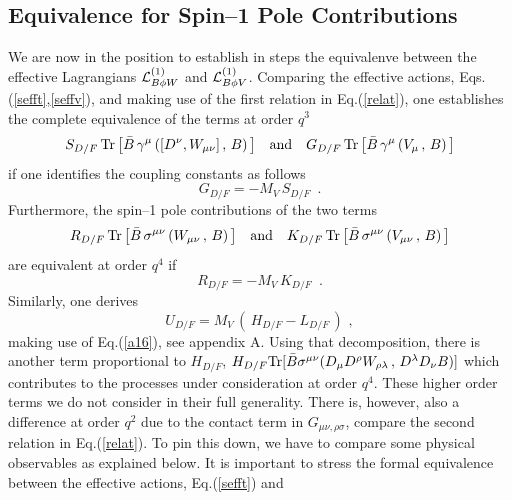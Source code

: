 \subsection{Equivalence for Spin--1 Pole Contributions}

We are now in the position to establish in steps the equivalenve
between the effective Lagrangians ${\cal L}_{B\phi W}^{(1)}$ and
${\cal L}_{B\phi V}^{(1)}$. Comparing the effective actions,
Eqs.(\ref{sefft},\ref{seffv}), and making use of the first relation in
Eq.(\ref{relat}), one establishes the complete equivalence of the
terms at order $q^3$
\begin{equation}
 S_{D/F} \, {\rm Tr} \, \bigl[ \bar{B} \, \gamma^\mu \, ( [D^\nu,
W_{\mu \nu}]\, , \, B) \, \bigr]
\quad {\rm and } \quad
 G_{D/F} \, {\rm Tr} \, \bigl[ \bar{B} \, \gamma^\mu \, (
V_\mu\, , \, B) \, \bigr]
\end{equation}
if one identifies the coupling constants as follows
\begin{equation}
 G_{D/F} = - M_V \,  S_{D/F} \,  \, \, .
\label{equiv1}
\end{equation}
Furthermore, the spin--1 pole contributions of the two terms
\begin{equation}
R_{D/F} \, {\rm Tr} \, \bigl[ \bar{B} \, \sigma^{\mu \nu} \, (
W_{\mu \nu} \, , \, B) \, \bigr] \quad {\rm and} \quad
 K_{D/F} \, {\rm Tr} \, \bigl[ \bar{B} \, \sigma^{\mu \nu} \, (
V_{\mu \nu} \, , \, B) \, \bigr]
\end{equation}
are equivalent at order $q^4$ if
\begin{equation}
 R_{D/F} = - M_V \,  K_{D/F} \,  \, \, .
\label{equiv2}
\end{equation}
Similarly, one derives
\begin{equation}
 U_{D/F} =  M_V \, (\, H_{D/F} - L_{D/F} \,)  \, \, ,
\label{equiv2a}
\end{equation}
making use of Eq.(\ref{a16}), see appendix A. Using that
decomposition, there is another term proportional to $H_{D/F}$,
$H_{D/F} {\rm Tr}[\bar{B} \sigma^{\mu \nu} (D_\mu D^\rho W_{\rho
  \lambda} \, , \, D^\lambda D_\nu B ) ] $ which contributes to the processes
under consideration at order $q^4$. These higher
order terms we do not consider in their full generality.
There is, however, also a  difference at order $q^2$ due to the contact
term in $G_{\mu \nu, \rho \sigma}$, compare the second relation in
Eq.(\ref{relat}). To pin this down, we have to compare some physical
observables as explained below. It is important to stress the formal
equivalence between the effective actions, Eq.(\ref{sefft}) and
